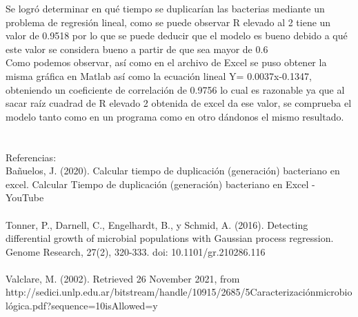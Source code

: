 \documentclass[12pt,a4paper]{article}
\begin{document}
    Se logró determinar en qué tiempo se duplicarían las bacterias mediante un problema de regresión lineal, como se puede observar R elevado al 2 tiene un valor de 0.9518 por lo que se puede deducir que el modelo es bueno debido a qué este valor se considera bueno a partir de que sea mayor de 0.6\\Como podemos observar, así como en el archivo de Excel se puso obtener la misma gráfica en Matlab así como la ecuación lineal Y= 0.0037x-0.1347, obteniendo un coeficiente de correlación de 0.9756 lo cual es razonable ya que al sacar raíz cuadrad de R elevado 2 obtenida de excel da ese valor, se comprueba el modelo tanto como en un programa como en otro dándonos el mismo resultado.\\\\\\
    Referencias:\\
    Bañuelos, J. (2020). Calcular tiempo de duplicación (generación) bacteriano en excel. Calcular Tiempo de duplicación (generación) bacteriano en Excel - YouTube\\\\
    Tonner, P., Darnell, C., Engelhardt, B., y Schmid, A. (2016). Detecting differential growth of microbial populations with Gaussian process regression. Genome Research, 27(2), 320-333. doi: 10.1101/gr.210286.116\\\\
    Valclare, M. (2002). Retrieved 26 November 2021, from http://sedici.unlp.edu.ar/bitstream/handle/10915/2685/5Caracterizaciónmicrobiológica.pdf?sequence=10isAllowed=y
    
    
\end{document}
